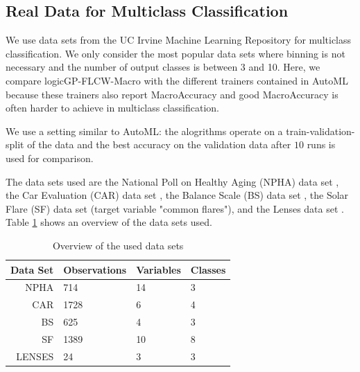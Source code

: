\documentclass[dvipsnames,format=sigconf,anonymous=false,review=false]{acmart}
\begin{document}
\subsection{Real Data for Multiclass Classification}


We use data sets from the UC Irvine Machine Learning Repository for multiclass classification. We only consider the most popular data sets where binning is not necessary and the number of output classes is between 3 and 10. Here, we compare logicGP-FLCW-Macro with the different trainers contained in AutoML because these trainers also report MacroAccuracy and good MacroAccuracy is often harder to achieve in multiclass classification.

We use a setting similar to AutoML: the alogrithms operate on a train-validation-split of the data and the best accuracy on the validation data after $10$ runs is used for comparison. 

The data sets used are the National Poll on Healthy Aging (NPHA) data set \citep{malani_national_2019}, the Car Evaluation (CAR) data set \citep{Bohanec1988KNOWLEDGEAA}, the Balance Scale (BS) data set \citep{balance_scale_12}, the Solar Flare (SF) data set \citep{solar_flare_89} (target variable "common flares"), and the Lenses data set \citep{lenses_58}. Table \ref{tab:datasets} shows an overview of the data sets used.

\begin{table}
\centering
\caption{Overview of the used data sets}
\label{tab:datasets}
\begin{tabular}{rlll}
  \toprule
Data Set & Observations & Variables & Classes \\ 
\midrule
NPHA             & 714                   & 14                 & 3                \\ 
CAR              & 1728                  & 6                  & 4                \\ 
BS               & 625                   & 4                  & 3                \\ 
SF               & 1389                  & 10                 & 8                \\ 
LENSES           & 24                    & 3                  & 3                \\
\bottomrule
\end{tabular}
\end{table}
\end{document}
